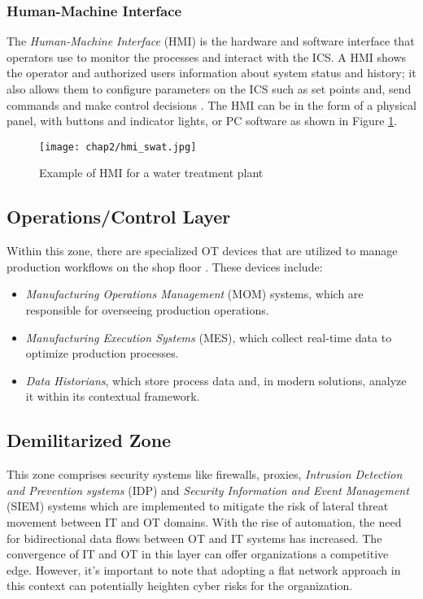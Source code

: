 \subsubsection{Human-Machine Interface}
\label{subsubsec:2_hmi}
The \textit{Human-Machine Interface} (HMI) is the hardware and software interface that operators use to monitor the processes and interact with the ICS. A HMI shows the operator and authorized users information about system status and history; it also allows them to configure parameters on the ICS such as set points and, send commands and make control decisions \cite{hmi_definition}.\newline
The HMI can be in the form of a physical panel, with buttons and indicator lights, or PC software as shown in Figure \ref{fig:2_hmi}.
\begin{figure}[ht]
	\centering
	\texttt{[image: chap2/hmi\_swat.jpg]}
	\caption{Example of HMI for a water treatment plant}
	\label{fig:2_hmi}
\end{figure}

\subsection{Operations/Control Layer}
\label{subsec:2_ot_operations_control_layer}
Within this zone, there are specialized OT devices that are utilized to manage production workflows on the shop floor \cite{purdue_layers_1}. These devices include:

\begin{itemize}
	\item \textit{Manufacturing Operations Management} (MOM) systems, which are responsible for overseeing production operations.
	\item \textit{Manufacturing Execution Systems} (MES), which collect real-time data to optimize production processes.
	\item \textit{Data Historians}, which store process data and, in modern solutions, analyze it within its contextual framework.
\end{itemize}

\subsection{Demilitarized Zone}
\label{subsec:2_dmz}
This zone comprises security systems like firewalls, proxies, \textit{Intrusion Detection and Prevention systems} (IDP) and \textit{Security Information and Event Management} (SIEM) systems which are implemented to mitigate the risk of lateral threat movement between IT and OT domains. With the rise of automation, the need for bidirectional data flows between OT and IT systems has increased. The convergence of IT and OT in this layer can offer organizations a competitive edge. However, it's important to note that adopting a flat network approach in this context can potentially heighten cyber risks for the organization.


